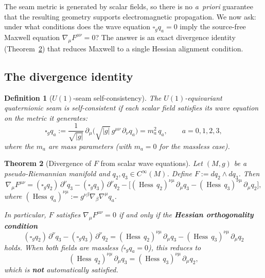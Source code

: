 \documentclass[pdflatex,sn-mathphys-num]{sn-jnl}
\theoremstyle{thmstyleone}%
\newtheorem{theorem}{Theorem}[section]
\theoremstyle{thmstyletwo}%
\theoremstyle{thmstylethree}%
\newtheorem{definition}[theorem]{Definition}
\DeclareMathOperator{\Hess}{Hess}
\newcommand{\pa}{\partial}
\newcommand{\nn}{\nabla}
\numberwithin{equation}{section}
\begin{document}
The seam metric is generated by scalar fields, so there is no
\emph{a~priori} guarantee that the resulting geometry supports
electromagnetic propagation.  We now ask: under what conditions
does the wave equation $\square_g q_a = 0$ imply the source-free
Maxwell equation $\nn_\mu F^{\mu\nu} = 0$?  The answer is an
exact divergence identity (Theorem~\ref{thm:maxwell-from-seam})
that reduces Maxwell to a single Hessian alignment condition.

\subsection{The divergence identity}

\begin{definition}[$U(1)$-seam self-consistency]
\label{def:u1-self-consistency}
The $U(1)$-equivariant quaternionic seam is \emph{self-consistent}
if each scalar field satisfies its wave equation on the metric it
generates:
\begin{equation}
\label{eq:u1-self-consistency}
\square_g q_a
:= \frac{1}{\sqrt{|g|}}\,\pa_\mu\bigl(\sqrt{|g|}\,g^{\mu\nu}\,
   \pa_\nu q_a\bigr) = m_a^2\,q_a,
\qquad a=0,1,2,3,
\end{equation}
where the $m_a$ are mass parameters
(with $m_a = 0$ for the massless case).
\end{definition}

\begin{theorem}[Divergence of $F$ from scalar wave equations]
\label{thm:maxwell-from-seam}
Let $(M,g)$ be a pseudo-Riemannian manifold and
$q_2,q_3\in C^\infty(M)$.  Define $F := dq_2\wedge dq_3$.
Then
\begin{equation}
\label{eq:div-F-exact}
\nn_\mu F^{\mu\nu}
= (\square_g q_2)\,\pa^\nu q_3
  - (\square_g q_3)\,\pa^\nu q_2
  - \bigl[
      (\Hess\,q_2)^{\nu\mu}\,\pa_\mu q_3
    - (\Hess\,q_3)^{\nu\mu}\,\pa_\mu q_2
    \bigr],
\end{equation}
where $(\Hess\,q_a)^{\nu\mu} := g^{\nu\beta}\nn_\beta\nn^\mu q_a$.

In particular, $F$ satisfies $\nn_\mu F^{\mu\nu} = 0$ if and only if
the \textbf{Hessian orthogonality condition}
\begin{equation}
\label{eq:hessian-orthogonality}
(\square_g q_2)\,\pa^\nu q_3
  - (\square_g q_3)\,\pa^\nu q_2
= (\Hess\,q_2)^{\nu\mu}\,\pa_\mu q_3
  - (\Hess\,q_3)^{\nu\mu}\,\pa_\mu q_2
\end{equation}
holds.
When both fields are massless ($\square_g q_a = 0$), this reduces to
\begin{equation}
\label{eq:hessian-condition-massless}
(\Hess\,q_2)^{\nu\mu}\,\pa_\mu q_3
= (\Hess\,q_3)^{\nu\mu}\,\pa_\mu q_2,
\end{equation}
which is \textbf{not} automatically satisfied.
\end{theorem}
\end{document}
